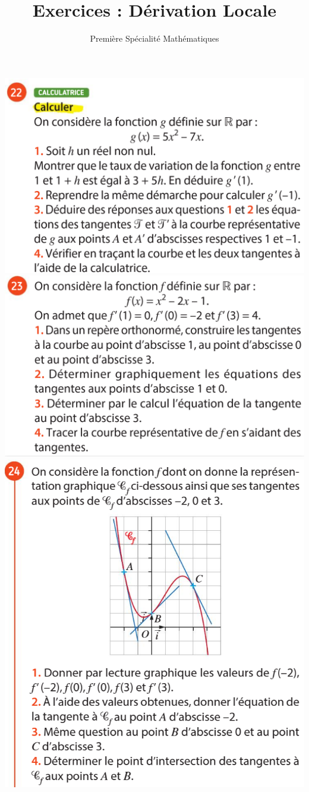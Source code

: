 \documentclass{article}
\title{Exercices : Dérivation Locale}
\author{Première Spécialité Mathématiques}
\date{}
\begin{document}
\maketitle

\begin{center}
\includegraphics[width=\textwidth]{Exercice_1.png}
\includegraphics[width=\textwidth]{Exercice_2.png}
\includegraphics[width=\textwidth]{Exercice_3.png}
\end{center}
\end{document}
